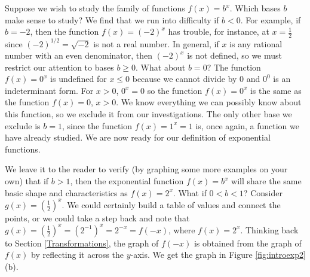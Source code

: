 \pagebreak

Suppose we wish to study the family of functions $f(x) = b^{x}$.  Which bases $b$ make sense to study?  We find that we run into difficulty if $b < 0$.  For example, if $b = -2$, then the function $f(x) = (-2)^{x}$ has trouble, for instance, at $x = \frac{1}{2}$ since $(-2)^{1/2} = \sqrt{-2}$ is not a real number. In general, if $x$ is any rational number with an even denominator, then $(-2)^{x}$ is not defined, so we must restrict our attention to bases $b \geq 0$.  What about $b = 0$?  The function $f(x) = 0^{x}$ is undefined for $x \leq 0$ because we cannot divide by $0$ and $0^{0}$ is an indeterminant form.  For $x > 0$, $0^{x} = 0$ so the function  $f(x) = 0^{x}$ is the same as the function $f(x) = 0$, $x > 0$.  \label{indeterminantformtwo} We know everything we can possibly know about this function, so we exclude it from our investigations.  The only other base we exclude is $b=1$, since the function $f(x) = 1^{x} = 1$ is, once again, a function we have already studied.  We are now ready for our definition of exponential functions.

\smallskip



\smallskip

We leave it to the reader to verify (by graphing some more examples on your own) that if $b > 1$, then the exponential function $f(x) = b^{x}$ will share the same basic shape and characteristics as $f(x) = 2^{x}$.  What if $0 < b < 1$?  Consider $g(x) = \left(\frac{1}{2}\right)^{x}$.  We could certainly build a table of values and connect the points, or we could take a step back and note that $g(x) = \left(\frac{1}{2}\right)^{x} = \left(2^{-1}\right)^{x} = 2^{-x} = f(-x)$, where $f(x) = 2^{x}$.  Thinking back to Section \ref{Transformations}, the graph of $f(-x)$ is obtained from the graph of $f(x)$ by reflecting it across the $y$-axis. We get the graph in Figure \ref{fig:introexp2} (b).


